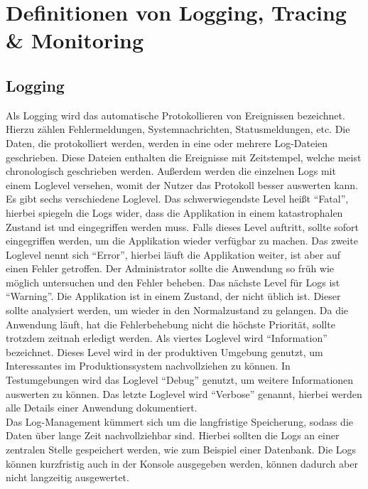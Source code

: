 \chapter{Definitionen von Logging, Tracing {\selectfont \&} Monitoring}\label{ch:definition-von-logging-tracing-&-monitoring}


\section{Logging}\label{sec:logging}
Als Logging wird das automatische Protokollieren von Ereignissen bezeichnet.
Hierzu zählen Fehlermeldungen, Systemnachrichten, Statusmeldungen, etc.
Die Daten, die protokolliert werden, werden in eine oder mehrere Log-Dateien geschrieben.
Diese Dateien enthalten die Ereignisse mit Zeitstempel, welche meist chronologisch geschrieben werden.
Außerdem werden die einzelnen Logs mit einem Loglevel versehen, womit der Nutzer das Protokoll besser auswerten kann.
Es gibt sechs verschiedene Loglevel.
Das schwerwiegendste Level heißt \enquote{Fatal}, hierbei spiegeln die Logs wider, dass die Applikation in einem katastrophalen Zustand ist und eingegriffen werden muss.
Falls dieses Level auftritt, sollte sofort eingegriffen werden, um die Applikation wieder verfügbar zu machen.
Das zweite Loglevel nennt sich \enquote{Error}, hierbei läuft die Applikation weiter, ist aber auf einen Fehler getroffen.
Der Administrator sollte die Anwendung so früh wie möglich untersuchen und den Fehler beheben.
Das nächste Level für Logs ist \enquote{Warning}.
Die Applikation ist in einem Zustand, der nicht üblich ist.
Dieser sollte analysiert werden, um wieder in den Normalzustand zu gelangen.
Da die Anwendung läuft, hat die Fehlerbehebung nicht die höchste Priorität, sollte trotzdem zeitnah erledigt werden.
Als viertes Loglevel wird \enquote{Information} bezeichnet.
Dieses Level wird in der produktiven Umgebung genutzt, um Interessantes im Produktionssystem nachvollziehen zu können.
In Testumgebungen wird das Loglevel \enquote{Debug} genutzt, um weitere Informationen auswerten zu können.
Das letzte Loglevel wird \enquote{Verbose} genannt, hierbei werden alle Details einer Anwendung dokumentiert.
\\
Das Log-Management kümmert sich um die langfristige Speicherung, sodass die Daten über lange Zeit nachvollziehbar sind.
Hierbei sollten die Logs an einer zentralen Stelle gespeichert werden, wie zum Beispiel einer Datenbank.
Die Logs können kurzfristig auch in der Konsole ausgegeben werden, können dadurch aber nicht langzeitig ausgewertet.

